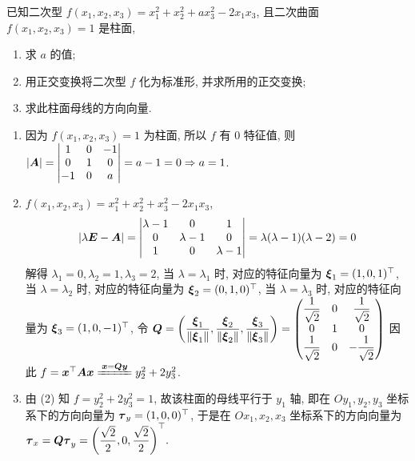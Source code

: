 \begin{example}
    已知二次型 $f(x_1, x_2, x_3)=x_1^2+x_2^2+ax_3^2-2x_1x_3$, 且二次曲面 $f(x_1, x_2, x_3)=1$ 是柱面,
    \begin{enumerate}[label=(\arabic{*})]
        \item 求 $a$ 的值;
        \item 用正交变换将二次型 $f$ 化为标准形, 并求所用的正交变换;
        \item 求此柱面母线的方向向量.
    \end{enumerate}
\end{example}
\begin{solution}
    \begin{enumerate}[label=(\arabic{*})]
        \item 因为 $f(x_1, x_2, x_3)=1$ 为柱面, 所以 $f$ 有 $0$ 特征值, 则 $|\vb*{A}|=\mqty|1&0&-1\\0&1&0\\-1&0&a|=a-1=0\Rightarrow a=1$.
        \item $f(x_1, x_2, x_3)=x_1^2+ x_2^2+ x_3^2-2x_1x_3$, $$
                  |\lambda\vb*{E}-\vb*{A}|=\mqty| \lambda-1 & 0 & 1 \\ 0 & \lambda-1 & 0 \\ 1 & 0 & \lambda-1 \\|=\lambda(\lambda-1)(\lambda-2)=0
              $$
              解得 $\lambda_1=0, \lambda_2=1, \lambda_3=2$, 当 $\lambda=\lambda_1$ 时, 对应的特征向量为 $\vb*{\xi}_1=(1,0,1)^\top$, 当 $\lambda=\lambda_2$ 时, 对应的特征向量为 $\vb*{\xi}_2=(0,1,0)^\top$, 当 $\lambda=\lambda_3$ 时, 对应的特征向量为 $\vb*{\xi}_3=(1,0,-1)^\top$,
              令 $\vb*{Q}=\qty(\dfrac{\vb*{\xi}_1}{\left\lVert \vb*{\xi}_1\right\rVert },\dfrac{\vb*{\xi}_2}{\left\lVert \vb*{\xi}_2\right\rVert },\dfrac{\vb*{\xi}_3}{\left\lVert \vb*{\xi}_3\right\rVert })=\begin{pmatrix} \dfrac{1}{\sqrt{2}} & 0 & \dfrac{1}{\sqrt{2}} \\ 0 & 1 & 0 \\ \dfrac{1}{\sqrt{2}} & 0 & -\dfrac{1}{\sqrt{2}} \\\end{pmatrix}$
              因此 $f=\vb*{x}^\top\vb*{Ax}\xlongequal{\vb*{x}=\vb*{Qy}}y_2^2+2y_3^2$.
        \item 由 (2) 知 $f=y_2^2+2y_3^2=1$, 故该柱面的母线平行于 $y_1$ 轴, 即在 $Oy_1, y_2, y_3$ 坐标系下的方向向量为 $\vb*{\tau }_y=(1,0,0)^\top$, 于是在 $Ox_1, x_2, x_3$ 坐标系下的方向向量为 $\vb*{\tau}_x=\vb*{Q\tau}_y=\qty(\dfrac{\sqrt{2}}{2},0,\dfrac{\sqrt{2}}{2})^\top.$
    \end{enumerate}
\end{solution}

